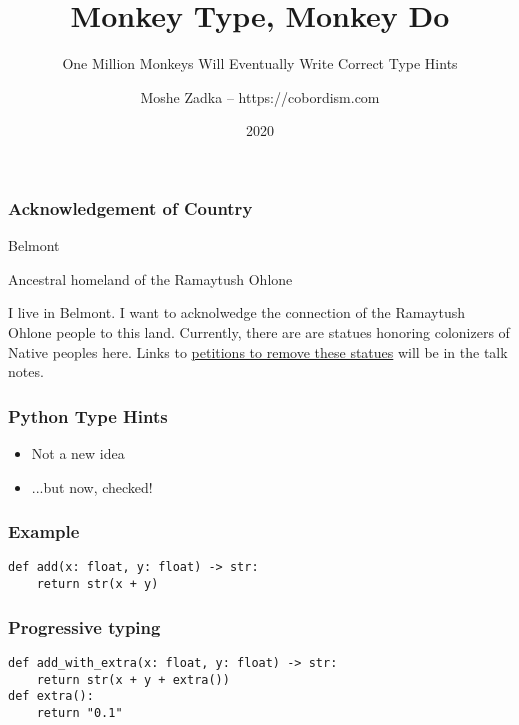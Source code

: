 \usepackage{hyperref}
\usepackage{graphicx}
\usepackage{listings}
\usepackage{textcomp}
\usepackage{fancyvrb}

\title{Monkey Type, Monkey Do}
\subtitle{One Million Monkeys Will Eventually Write Correct Type Hints}
\author{Moshe Zadka -- https://cobordism.com}
\date{2020}


\begin{titlepage}
\maketitle
\end{titlepage}

\frame{\titlepage}


\begin{frame}
\frametitle{Acknowledgement of Country}

Belmont

Ancestral homeland of the Ramaytush Ohlone

\end{frame}

I live in Belmont. I want to
acknolwedge the connection of the Ramaytush Ohlone people to this land.
Currently, there are are statues honoring colonizers of Native peoples
here. Links to
\href{http://www.ramaytush.com/remove-statues.html}{petitions to remove
these statues} will be in the talk notes.

\begin{frame}
\frametitle{Python Type Hints}
\begin{itemize}
\item Not a new idea
\item ...but now, checked!
\end{itemize}
\end{frame}

\begin{frame}[fragile]
\frametitle{Example}
\begin{lstlisting}
def add(x: float, y: float) -> str:
    return str(x + y)
\end{lstlisting}
\end{frame}

\begin{frame}[fragile]
\frametitle{Progressive typing}
\begin{lstlisting}
def add_with_extra(x: float, y: float) -> str:
    return str(x + y + extra())
def extra():
    return "0.1"
\end{lstlisting}
\end{frame}

